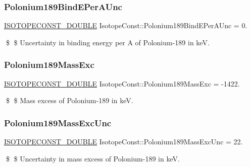 \subsubsection{\texorpdfstring{Polonium189\+Bind\+E\+Per\+A\+Unc}{Polonium189BindEPerAUnc}}
{\footnotesize\ttfamily \mbox{\hyperlink{group___isotope_const-_macros_ga8f45a7272ce02c0b4c65c44636ed719a}{I\+S\+O\+T\+O\+P\+E\+C\+O\+N\+S\+T\+\_\+\+D\+O\+U\+B\+LE}} Isotope\+Const\+::\+Polonium189\+Bind\+E\+Per\+A\+Unc = 0.}

\$ \$ Uncertainty in binding energy per A of Polonium-\/189 in keV. \mbox{\label{group___isotope_const-_polonium-_po189_gad430e50f7e0f7969b5deaf1036ea5c39}} 
\subsubsection{\texorpdfstring{Polonium189\+Mass\+Exc}{Polonium189MassExc}}
{\footnotesize\ttfamily \mbox{\hyperlink{group___isotope_const-_macros_ga8f45a7272ce02c0b4c65c44636ed719a}{I\+S\+O\+T\+O\+P\+E\+C\+O\+N\+S\+T\+\_\+\+D\+O\+U\+B\+LE}} Isotope\+Const\+::\+Polonium189\+Mass\+Exc = -\/1422.}

\$ \$ Mass excess of Polonium-\/189 in keV. \mbox{\label{group___isotope_const-_polonium-_po189_ga0d8275d9f2760556804ec0a9fdf42572}} 
\subsubsection{\texorpdfstring{Polonium189\+Mass\+Exc\+Unc}{Polonium189MassExcUnc}}
{\footnotesize\ttfamily \mbox{\hyperlink{group___isotope_const-_macros_ga8f45a7272ce02c0b4c65c44636ed719a}{I\+S\+O\+T\+O\+P\+E\+C\+O\+N\+S\+T\+\_\+\+D\+O\+U\+B\+LE}} Isotope\+Const\+::\+Polonium189\+Mass\+Exc\+Unc = 22.}

\$ \$ Uncertainty in mass excess of Polonium-\/189 in keV. \mbox{\label{group___isotope_const-_polonium-_po189_gac95bee1a407a70596044b2f4e01473e1}} 
